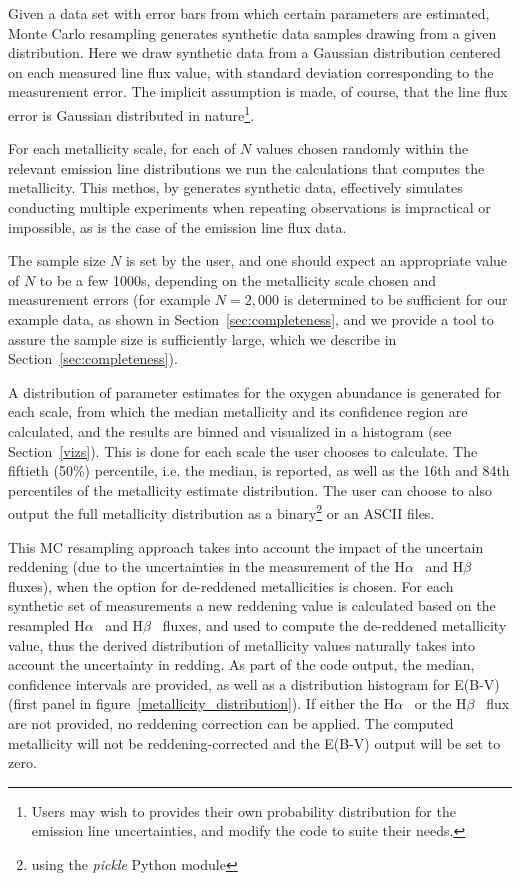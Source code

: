\documentclass{emulateapj}
\newcommand{\ha}{H$\alpha$}
\newcommand{\hb}{H$\beta$}
\begin{document}
Given a data set with error bars from which certain parameters are estimated, Monte Carlo resampling generates synthetic data samples drawing from a given distribution. 
Here we draw synthetic data from a Gaussian distribution centered on each measured line flux value, with standard deviation corresponding to the measurement error. The implicit assumption is made, of course, that the line flux error is Gaussian distributed in nature\footnote{Users may wish to provides their own probability distribution for the emission line uncertainties, and modify the code to suite their needs.}. 

For each metallicity scale, for each of $N$  values chosen randomly within the relevant emission line distributions we run the calculations that computes the metallicity.
This methos, by generates synthetic data, effectively simulates conducting multiple experiments when repeating observations is impractical or impossible, as is the case of the emission line flux data.

The sample size $N$ is set by the user, and one should expect an appropriate value of $N$ to be a few 1000s, depending on the metallicity scale chosen and measurement errors (for example  $N=2,000$ is determined to be sufficient for our example data, as shown in Section~\ref{sec:completeness}, and we provide a tool to assure the sample size is sufficiently large, which we describe in Section~\ref{sec:completeness}). 

A distribution of parameter estimates for the oxygen abundance is generated for each scale, from which the median metallicity and its confidence region are calculated,
and the results are binned and visualized in a histogram (see Section~\ref{vizs}). This is done for each scale the user chooses to calculate. The fiftieth (50\%) percentile, i.e.  the median, is reported, as well as the 16th and 84th percentiles of the metallicity estimate distribution. The user can choose to also output the full metallicity distribution as a binary\footnote{using the \emph{pickle} Python module} or an ASCII files.

This MC resampling approach takes into account the impact of the uncertain reddening (due to the uncertainties in the measurement of the 
\ha~ and \hb~ fluxes), when the option for de-reddened metallicities is chosen. For each synthetic set of measurements a new reddening value is calculated based on the resampled \ha~ and \hb~ fluxes, and used to compute the de-reddened metallicity value, thus the derived distribution of metallicity values naturally takes into account the uncertainty in redding. As part of the code output, the median, confidence intervals  are provided, as well as a distribution histogram for E(B-V) (first panel in figure~\ref{metallicity_distribution}). If either the \ha~ or the \hb~ flux are not provided, no reddening correction can be applied. The computed metallicity will not be reddening-corrected and the E(B-V) output will be set to zero.
\end{document}
